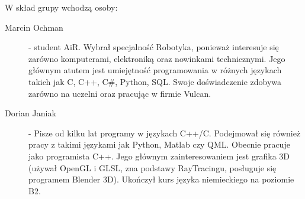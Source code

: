 W skład grupy wchodzą osoby:
\begin{description}
\item[Marcin Ochman] - student AiR. Wybrał specjalność Robotyka, ponieważ interesuje się zarówno komputerami, elektroniką oraz nowinkami technicznymi.
	Jego głównym atutem jest umiejętność programowania w różnych językach takich jak C, C++, C\#, Python, SQL. 
	Swoje doświadczenie zdobywa zarówno na uczelni oraz pracując w firmie Vulcan.	
\item[Dorian Janiak] - Pisze od kilku lat programy w językach C++/C. Podejmował się również pracy z takimi językami jak Python, Matlab czy QML. Obecnie pracuje jako programista C++. Jego głównym zainteresowaniem jest grafika 3D (używał OpenGL i GLSL, zna podstawy RayTracingu, posługuje się programem Blender 3D). Ukończył kurs języka niemieckiego na poziomie B2.
\end{description}
